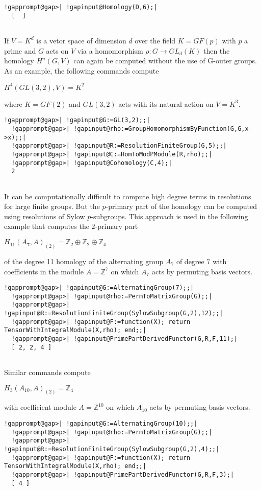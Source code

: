 \documentclass[a4paper,11pt]{report}
\begin{document}
{{\begin{Verbatim}[commandchars=!@|,fontsize=\small,frame=single,label=Example]
  !gapprompt@gap>| !gapinput@Homology(D,6);|
  [  ]
  
\end{Verbatim}
 

If $V=K^d$ is a vetor space of dimension $d$ over the field $K=GF(p)$ with $p$ a prime and $G$ acts on $V$ via a homomorphism $\rho\colon G\rightarrow GL_d(K)$ then the homology $H^n(G,V)$ can again be computed without the use of G-outer groups. As an example, the
following commands compute 

$H^4(GL(3,2),V) =K^2$ 

where $K=GF(2)$ and $GL(3,2)$ acts with its natural action on $V=K^3$. 
\begin{Verbatim}[commandchars=!@|,fontsize=\small,frame=single,label=Example]
  !gapprompt@gap>| !gapinput@G:=GL(3,2);;|
  !gapprompt@gap>| !gapinput@rho:=GroupHomomorphismByFunction(G,G,x->x);;|
  !gapprompt@gap>| !gapinput@R:=ResolutionFiniteGroup(G,5);;|
  !gapprompt@gap>| !gapinput@C:=HomToModPModule(R,rho);;|
  !gapprompt@gap>| !gapinput@Cohomology(C,4);|
  2
  
\end{Verbatim}
 

 It can be computationally difficult to compute high degree terms in
resolutions for large finite groups. But the $p$-primary part of the homology can be computed using resolutions of Sylow $p$-subgroups. This approach is used in the following example that computes the $2$-primary part 

$H_{11}(A_7,A)_{(2)} = \mathbb Z_2 \oplus \mathbb Z_2\oplus \mathbb Z_4$ 

of the degree 11 homology of the alternating group $A_7$ of degree $7$ with coefficients in the module $A=\mathbb Z^7$ on which $A_7$ acts by permuting basis vectors. 
\begin{Verbatim}[commandchars=!@|,fontsize=\small,frame=single,label=Example]
  !gapprompt@gap>| !gapinput@G:=AlternatingGroup(7);;|
  !gapprompt@gap>| !gapinput@rho:=PermToMatrixGroup(G);;|
  !gapprompt@gap>| !gapinput@R:=ResolutionFiniteGroup(SylowSubgroup(G,2),12);;|
  !gapprompt@gap>| !gapinput@F:=function(X); return TensorWithIntegralModule(X,rho); end;;|
  !gapprompt@gap>| !gapinput@PrimePartDerivedFunctor(G,R,F,11);|
  [ 2, 2, 4 ]
  
\end{Verbatim}
 Similar commands compute 

$H_{3}(A_{10},A)_{(2)} = \mathbb Z_4$ 

with coefficient module $A=\mathbb Z^{10}$ on which $A_{10}$ acts by permuting basis vectors. 
\begin{Verbatim}[commandchars=!@|,fontsize=\small,frame=single,label=Example]
  !gapprompt@gap>| !gapinput@G:=AlternatingGroup(10);;|
  !gapprompt@gap>| !gapinput@rho:=PermToMatrixGroup(G);;|
  !gapprompt@gap>| !gapinput@R:=ResolutionFiniteGroup(SylowSubgroup(G,2),4);;|
  !gapprompt@gap>| !gapinput@F:=function(X); return TensorWithIntegralModule(X,rho); end;;|
  !gapprompt@gap>| !gapinput@PrimePartDerivedFunctor(G,R,F,3);|
  [ 4 ]
  

\end{Verbatim}}}
\end{document}
